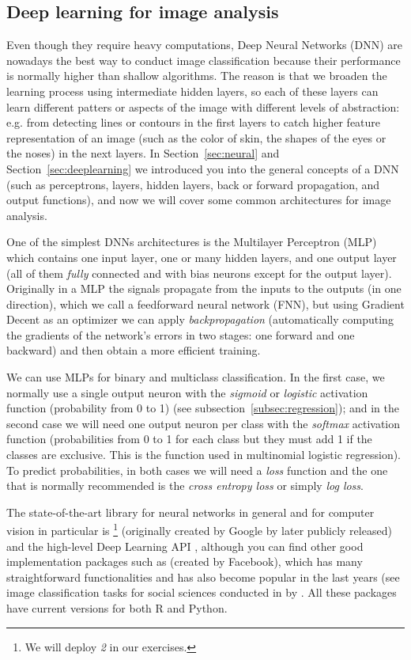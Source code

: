 \subsection{Deep learning for image analysis}
\label{subsec:deep}

Even though they require heavy computations, Deep Neural Networks (DNN) are nowadays the best way to conduct image classification because their performance is normally higher than shallow algorithms. The reason is that we broaden the learning process using intermediate hidden layers, so each of these layers can learn different patters or aspects of the image with different levels of abstraction: e.g. from detecting lines or contours in the first layers to catch higher feature representation of an image (such as the color of skin, the shapes of the eyes or the noses) in the next layers. In Section~\ref{sec:neural} and Section~\ref{sec:deeplearning} we introduced you into the general concepts of a DNN (such as perceptrons, layers, hidden layers, back or forward propagation, and output functions), and now we will cover some common architectures for image analysis.

One of the simplest DNNs architectures is the Multilayer Perceptron (MLP) which contains one input layer, one or many hidden layers, and one output layer (all of them \textit{fully} connected and with bias neurons except for the output layer). Originally in a MLP the signals propagate from the inputs to the outputs (in one direction), which we call a feedforward neural network (FNN), but using Gradient Decent as an optimizer we can apply \textit{backpropagation} (automatically computing the gradients of the network's errors in two stages: one forward and one backward) and then obtain a more efficient training.

We can use MLPs for binary and multiclass classification. In the first case, we normally use a single output neuron with the \textit{sigmoid} or \textit{logistic} activation function (probability from 0 to 1) (see subsection~\ref{subsec:regression}); and in the second case we will need one output neuron per class with the \textit{softmax} activation function (probabilities from 0 to 1 for each class but they must add 1 if the classes are exclusive. This is the function used in multinomial logistic regression). To predict probabilities, in both cases we will need a \textit{loss} function and the one that is normally recommended is the \textit{cross entropy loss} or simply \textit{log loss}.

The state-of-the-art library for neural networks in general and for computer vision in particular is \footnote{We will deploy  \textit{2} in our exercises.}  (originally created by Google by later publicly released) and the high-level Deep Learning API , although you can find other good implementation packages such as  (created by Facebook), which has many straightforward functionalities and has also become popular in the last years (see image classification tasks for social sciences conducted in  by \citet{williams2020images}. All these packages have current versions for both R and Python. 

